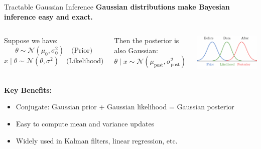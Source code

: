 \documentclass[handout,aspectratio=169]{beamer}
\begin{document}
\begin{frame}{Tractable Gaussian Inference}
  \textbf{Gaussian distributions make Bayesian inference easy and exact.}

  \vspace{1em}
  \begin{columns}
Suppose we have:
  \[
    \theta \sim \mathcal{N}(\mu_0, \sigma_0^2) \quad \text{(Prior)}
  \]
  \[
    x \mid \theta \sim \mathcal{N}(\theta, \sigma^2) \quad \text{(Likelihood)}
  \]

  \vspace{1em}
  Then the posterior is also Gaussian:
  \[
    \theta \mid x \sim \mathcal{N}(\mu_{\text{post}}, \sigma_{\text{post}}^2)
  \]
  
    \includegraphics[width=0.8\linewidth]{chapter_figs/01_figs/gaussian.png}
\end{columns}
  

  \vspace{0.5em}
  \textbf{Key Benefits:}
  \begin{itemize}
    \item Conjugate: Gaussian prior + Gaussian likelihood = Gaussian posterior
    \item Easy to compute mean and variance updates
    \item Widely used in Kalman filters, linear regression, etc.
  \end{itemize}

\end{frame}


{
	\begin{frame}
	\end{frame}}
\end{document}
